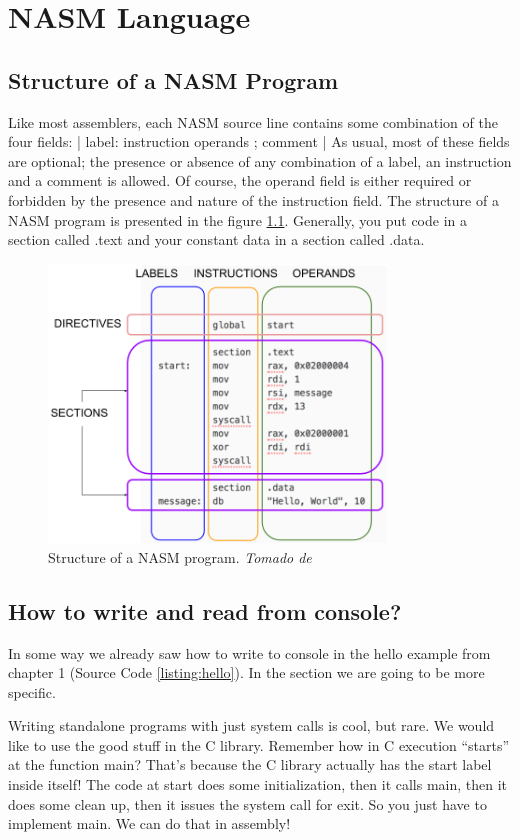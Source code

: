 \chapter{NASM Language}
\section{Structure of a NASM Program}
Like most assemblers, each NASM source line contains some combination of the four fields:
| label: instruction operands ; comment |
As usual, most of these fields are optional; the presence or absence of any combination of a label, an instruction and a comment is allowed. Of course, the operand field is either required or forbidden by the presence and nature of the instruction field. The structure of a NASM program is presented in the figure \ref{fig:structure}. Generally, you put code in a section called .text and your constant data in a section called .data.
\begin{figure}[ht]
	\centering
	\includegraphics[width=0.8\textwidth]{fig/nasmstructure.png} 
	\caption{Structure of a NASM program. \textit{Tomado de \cite{website:NASM-Tutorial}}}
	\label{fig:structure}
\end{figure}

\section{How to write and read from console?}
In some way we already saw how to write to console in the hello example from chapter 1 (Source Code \ref{listing:hello}). In the section we are going to be more specific.

Writing standalone programs with just system calls is cool, but rare. We would like to use the good stuff in the C library. Remember how in C execution “starts” at the function main? That's because the C library actually has the \textunderscore start label inside itself! The code at \textunderscore start does some initialization, then it calls main, then it does some clean up, then it issues the system call for exit. So you just have to implement main. We can do that in assembly!

